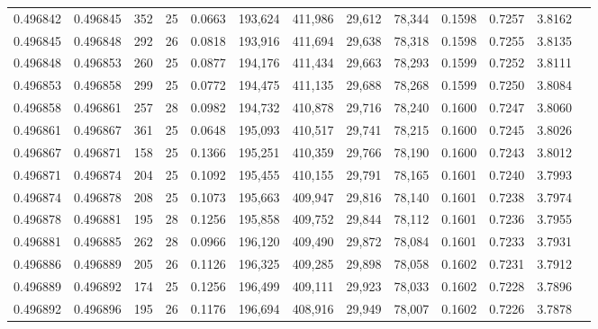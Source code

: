 \begin{tabular}{rrrrrrrrrrrrr}
0.496842 & 0.496845 & 352 &  25 &                                     0.0663 & 193,624 & 411,986 &  29,612 &  78,344 & 0.1598 & 0.7257 & 3.8162 \\
0.496845 & 0.496848 & 292 &  26 &                                     0.0818 & 193,916 & 411,694 &  29,638 &  78,318 & 0.1598 & 0.7255 & 3.8135 \\
0.496848 & 0.496853 & 260 &  25 &                                     0.0877 & 194,176 & 411,434 &  29,663 &  78,293 & 0.1599 & 0.7252 & 3.8111 \\
0.496853 & 0.496858 & 299 &  25 &                                     0.0772 & 194,475 & 411,135 &  29,688 &  78,268 & 0.1599 & 0.7250 & 3.8084 \\
0.496858 & 0.496861 & 257 &  28 &                                     0.0982 & 194,732 & 410,878 &  29,716 &  78,240 & 0.1600 & 0.7247 & 3.8060 \\
0.496861 & 0.496867 & 361 &  25 &                                     0.0648 & 195,093 & 410,517 &  29,741 &  78,215 & 0.1600 & 0.7245 & 3.8026 \\
0.496867 & 0.496871 & 158 &  25 &                                     0.1366 & 195,251 & 410,359 &  29,766 &  78,190 & 0.1600 & 0.7243 & 3.8012 \\
0.496871 & 0.496874 & 204 &  25 &                                     0.1092 & 195,455 & 410,155 &  29,791 &  78,165 & 0.1601 & 0.7240 & 3.7993 \\
0.496874 & 0.496878 & 208 &  25 &                                     0.1073 & 195,663 & 409,947 &  29,816 &  78,140 & 0.1601 & 0.7238 & 3.7974 \\
0.496878 & 0.496881 & 195 &  28 &                                     0.1256 & 195,858 & 409,752 &  29,844 &  78,112 & 0.1601 & 0.7236 & 3.7955 \\
0.496881 & 0.496885 & 262 &  28 &                                     0.0966 & 196,120 & 409,490 &  29,872 &  78,084 & 0.1601 & 0.7233 & 3.7931 \\
0.496886 & 0.496889 & 205 &  26 &                                     0.1126 & 196,325 & 409,285 &  29,898 &  78,058 & 0.1602 & 0.7231 & 3.7912 \\
0.496889 & 0.496892 & 174 &  25 &                                     0.1256 & 196,499 & 409,111 &  29,923 &  78,033 & 0.1602 & 0.7228 & 3.7896 \\
0.496892 & 0.496896 & 195 &  26 &                                     0.1176 & 196,694 & 408,916 &  29,949 &  78,007 & 0.1602 & 0.7226 & 3.7878 \\

\end{tabular}
